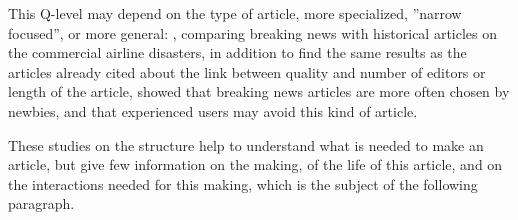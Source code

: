 
This Q-level may depend on the type of article, more specialized,
''narrow focused'', or more general: \citet{KeeganGergleContractor12},
comparing breaking news with historical articles on the commercial
airline disasters, in addition to find the same results as the articles
already cited about the link between quality and number of editors
or length of the article, showed that breaking news articles are more
often chosen by newbies, and that experienced users may avoid this
kind of article.

These studies on the structure help to understand what is needed to
make an article, but give few information on the making, of the life
of this article, and on the interactions needed for this making, which
is the subject of the following paragraph. 